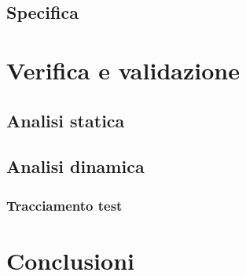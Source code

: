 \documentclass[a4paper,13pt,twoside]{article}
\begin{document}
\newpage
\subsection{Specifica} \label{sec:specifica}

\newpage
\section{Verifica e validazione}
\subsection{Analisi statica}

\subsection{Analisi dinamica}

\subsubsection{Tracciamento test}
\newpage
\section{Conclusioni}
\newpage

%
%


%

\appendix
%
%
%
\end{document}
